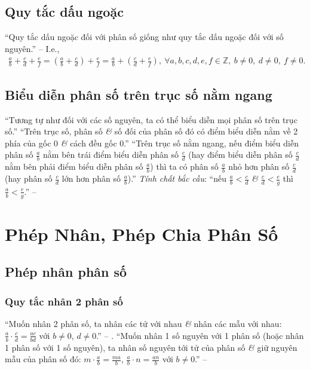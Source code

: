 \documentclass[oneside]{book}
\numberwithin{equation}{section}
\begin{document}
\subsection{Quy tắc dấu ngoặc}
``Quy tắc dấu ngoặc đối với phân số giống như quy tắc dấu ngoặc đối với số nguyên.'' -- \cite[p. 37]{Thai_Anh_Dat_Ha_Loan_Nam_Quang_Toan_6_tap_2} I.e.,
\begin{align*}
	\frac{a}{b} + \frac{c}{d} + \frac{e}{f} = \left(\frac{a}{b} + \frac{c}{d}\right) + \frac{e}{f} = \frac{a}{b} + \left(\frac{c}{d} + \frac{e}{f}\right),\ \forall a,b,c,d,e,f\in\mathbb{Z},\ b\ne 0,\ d\ne 0,\ f\ne 0.
\end{align*}

\subsection{Biểu diễn phân số trên trục số nằm ngang}
``Tương tự như đối với các số nguyên, ta có thể biểu diễn mọi phân số trên trục số.'' ``Trên trục số, phân số \textit{\&} số đối của phân số đó có điểm biểu diễn nằm về 2 phía của gốc 0 \textit{\&} cách đều gốc 0.'' ``Trên trục số nằm ngang, nếu điểm biểu diễn phân số $\frac{a}{b}$ nằm bên trái điểm biểu diễn phân số $\frac{c}{d}$ (hay điểm biểu diễn phân số $\frac{c}{d}$ nằm bên phải điểm biểu diễn phân số $\frac{a}{b}$) thì ta có phân số $\frac{a}{b}$ nhỏ hơn phân số $\frac{c}{d}$ (hay phân số $\frac{c}{d}$ lớn hơn phân số $\frac{a}{b}$).'' \textit{Tính chất bắc cầu}: ``nếu $\frac{a}{b} < \frac{c}{d}$ \textit{\&} $\frac{c}{d} < \frac{e}{g}$ thì $\frac{a}{b} < \frac{e}{g}$.'' -- \cite[p. 39]{Thai_Anh_Dat_Ha_Loan_Nam_Quang_Toan_6_tap_2}

\section{Phép Nhân, Phép Chia Phân Số}

\subsection{Phép nhân phân số}

\subsubsection{Quy tắc nhân 2 phân số}
``Muốn nhân 2 phân số, ta nhân các tử với nhau \textit{\&} nhân các mẫu với nhau: $\frac{a}{b}\cdot\frac{c}{d} = \frac{ac}{bd}$ với $b\ne 0$, $d\ne 0$.'' -- \cite[p. 40]{Thai_Anh_Dat_Ha_Loan_Nam_Quang_Toan_6_tap_2}. ``Muốn nhân 1 số nguyên với 1 phân số (hoặc nhân 1 phân số với 1 số nguyên), ta nhân số nguyên tới tử của phân số \textit{\&} giữ nguyên mẫu của phân số đó: $m\cdot\frac{a}{b} = \frac{ma}{b}$, $\frac{a}{b}\cdot n = \frac{an}{b}$ với $b\ne 0$.'' -- \cite[p. 41]{Thai_Anh_Dat_Ha_Loan_Nam_Quang_Toan_6_tap_2}
\end{document}
